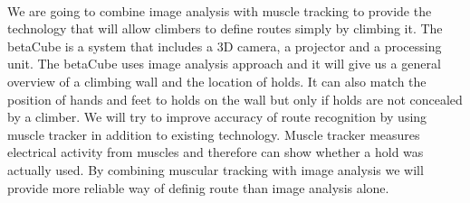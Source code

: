 \\
We are going to combine image analysis with muscle tracking to provide the technology that will allow climbers to define routes simply by climbing it.
The betaCube is a system that includes a 3D camera, a projector and a processing unit.
The betaCube uses image analysis approach and it will give us a general overview of a climbing wall and the location of holds.
It can also match the position of hands and feet to holds on the wall but only if holds are not concealed by a climber.
We will try to improve accuracy of route recognition by using muscle tracker in addition to existing technology.
Muscle tracker measures electrical activity from muscles and therefore can show whether a hold was actually used.
By combining muscular tracking with image analysis we will provide more reliable way of definig route than image analysis alone.
\\
